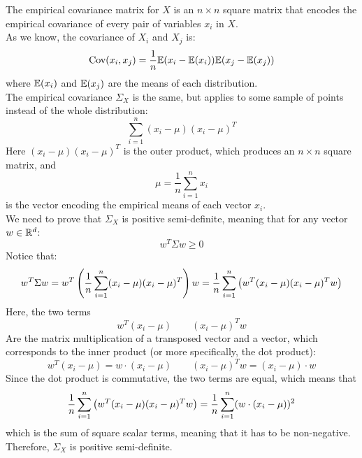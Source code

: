 \documentclass[12pt]{article}
\begin{document}
\begin{enumerate}[label=\alph*)]
        The empirical covariance matrix for $X$
        is an $n \times n$ square matrix that
        encodes the empirical covariance of every pair
        of variables $x_i$ in $X$. \\
        As we know, the covariance of $X_i$ and $X_j$
        is:
        \[ \text{Cov}(x_i, x_j) =  
        \dfrac{1}{n}\mathbb{E}(x_i - \mathbb{E}(x_i))\mathbb{E}(x_j - \mathbb{E}(x_j)) \]
        where $\mathbb{E}(x_i)$ and $\mathbb{E}(x_j)$
        are the means of each distribution. \\
        The empirical covariance $\Sigma_X$
        is the same,
        but applies to some sample of points
        instead of the whole distribution:
        \[ \sum_{i = 1}^{n}(x_i - \mu)(x_i-\mu)^T \]
        Here $(x_i - \mu)(x_i-\mu)^T$
        is the outer product,
        which produces an $n \times n$ square matrix,
        and
        \[\mu = \dfrac{1}{n}\sum_{i=1}^{n}x_i \]
        is the vector encoding the empirical
        means of each vector $x_i$. \\
        We need to prove that $\Sigma_X$
        is positive semi-definite,
        meaning that for any vector $w \in \mathbb{R}^d$:
        \[ w^T\Sigma w \geq 0 \]
        Notice that:
        \[ w^T\Sigma w = w^T \left( 
            \dfrac{1}{n}\sum_{i = 1}^{n}(x_i - \mu)
            (x_i-\mu)^T  \right) w
        =  \dfrac{1}{n}\sum_{i = 1}^{n} \left( 
        w^T (x_i - \mu)(x_i-\mu)^T w  \right) \]
        Here, the two terms
        \[ w^T (x_i - \mu) \qquad (x_i-\mu)^T w \]
        Are the matrix multiplication
        of a transposed vector and a vector,
        which corresponds to the inner product
        (or more specifically, the dot product):
        \[ w^T (x_i - \mu) = w \cdot (x_i - \mu)
        \qquad (x_i-\mu)^T w = (x_i - \mu) \cdot w \]
        Since the dot product is commutative,
        the two terms are equal,
        which means that 
        \[ \dfrac{1}{n}\sum_{i = 1}^{n} \left( 
            w^T (x_i - \mu)(x_i-\mu)^T w  \right)
        =  \dfrac{1}{n}\sum_{i = 1}^{n}
            (w\cdot(x_i - \mu))^2 \]
        which is the sum of square scalar terms,
        meaning that it has to be non-negative. \\
        Therefore, 
        $\Sigma_X$ is positive semi-definite. \\

    \end{enumerate}

    \begingroup
    \color{red}
\end{document}
